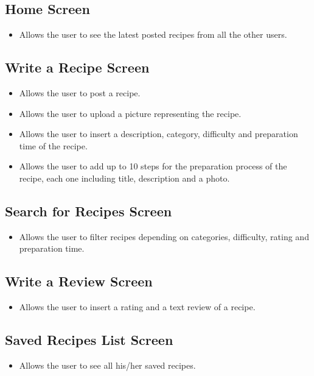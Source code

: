 	\subsection{Home Screen}
		\begin{itemize}
			\item Allows the user to see the latest posted recipes from all the other users.
			
		\end{itemize}

	\subsection{Write a Recipe Screen}
		\begin{itemize}
			\item Allows the user to post a recipe.
			
			\item Allows the user to upload a picture representing the recipe.
			
			\item Allows the user to insert a description, category, difficulty and preparation time of the recipe.
			
			\item Allows the user to add up to 10 steps for the preparation process of the recipe, each one including title, description and a photo.
		\end{itemize}

	\subsection{Search for Recipes Screen}
		\begin{itemize}
			\item Allows the user to filter recipes depending on categories, difficulty, rating and preparation time.
		\end{itemize}

	\subsection{Write a Review Screen}
		\begin{itemize}
			\item Allows the user to insert a rating and a text review of a recipe.
		\end{itemize}

	\subsection{Saved Recipes List Screen}
		\begin{itemize}
			\item Allows the user to see all his/her saved recipes.
		\end{itemize}

